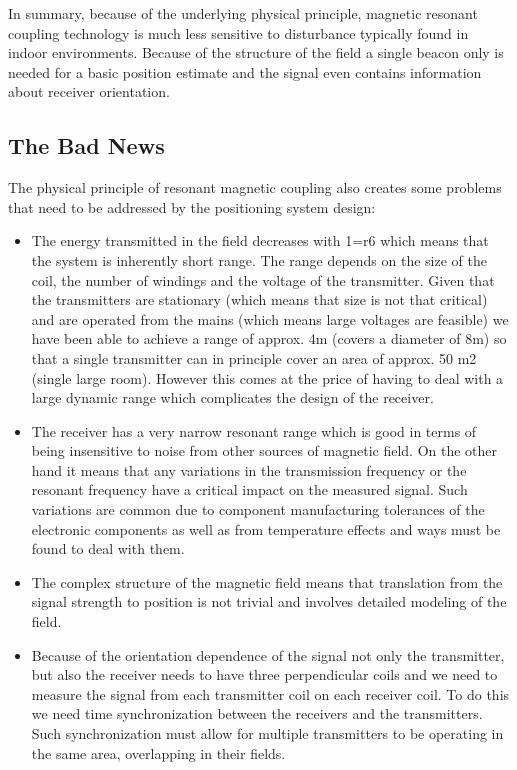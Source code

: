 \documentclass[a4paper,11pt]{article}
\begin{document}
In summary, because of the underlying physical principle,
magnetic resonant coupling technology is much less sensitive
to disturbance typically found in indoor environments.
Because of the structure of the field a single beacon only
is needed for a basic position estimate and the signal even
contains information about receiver orientation.

\subsection{The Bad News}

The physical principle of resonant magnetic coupling also
creates some problems that need to be addressed by the positioning
system design:
\begin{itemize}
\item The energy transmitted in the field decreases with 1=r6
which means that the system is inherently short range.
The range depends on the size of the coil, the number of
windings and the voltage of the transmitter. Given that
the transmitters are stationary (which means that size is
not that critical) and are operated from the mains (which
means large voltages are feasible) we have been able to
achieve a range of approx. 4m (covers a diameter of 8m)
so that a single transmitter can in principle cover an area of
approx. 50 m2 (single large room). However this comes
at the price of having to deal with a large dynamic range
which complicates the design of the receiver.
\item The receiver has a very narrow resonant range which is
good in terms of being insensitive to noise from other
sources of magnetic field. On the other hand it means
that any variations in the transmission frequency or the
resonant frequency have a critical impact on the measured
signal. Such variations are common due to component
manufacturing tolerances of the electronic components as
well as from temperature effects and ways must be found
to deal with them.
\item The complex structure of the magnetic field means that
translation from the signal strength to position is not trivial
and involves detailed modeling of the field.
\item Because of the orientation dependence of the signal not
only the transmitter, but also the receiver needs to have
three perpendicular coils and we need to measure the signal
from each transmitter coil on each receiver coil. To do
this we need time synchronization between the receivers
and the transmitters. Such synchronization must allow
for multiple transmitters to be operating in the same area,
overlapping in their fields.
\end{itemize}
\end{document}
